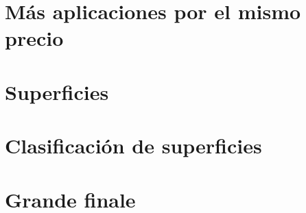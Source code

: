 \documentclass[10pt,a4paper,openright]{book}
\theoremstyle{break}
\begin{document}
\chapter{Más aplicaciones por el mismo precio}%
\label{cha:mas_aplicaciones_por_el_mismo_precio}

\chapter{Superficies}%
\label{cha:superficies}

\chapter{Clasificación de superficies}%
\label{cha:clasificacion_de_superficies}

\chapter{Grande finale}%
\label{cha:grande_finale}
\end{document}
